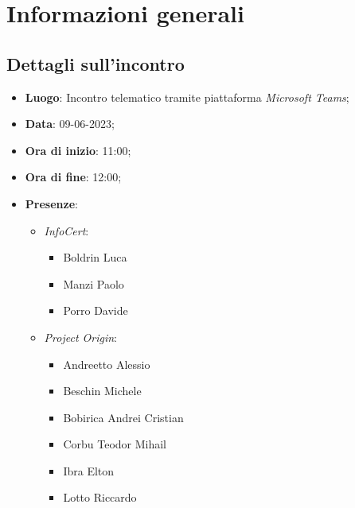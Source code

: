 \section{Informazioni generali}

\subsection{Dettagli sull'incontro}
\begin{itemize}
\item \textbf{Luogo}: Incontro telematico tramite piattaforma \textit{Microsoft Teams\glo};
\item \textbf{Data}: 09-06-2023;
\item \textbf{Ora di inizio}: 11:00;
\item \textbf{Ora di fine}: 12:00;
\item \textbf{Presenze}: 
\begin{itemize}
    \item \textit{InfoCert}: \begin{itemize}
            \item Boldrin Luca 
            \item Manzi Paolo
            \item Porro Davide 
        \end{itemize}  
    \item \textit{Project Origin}:  \begin{itemize}
        \item Andreetto Alessio
        \item Beschin Michele
        \item Bobirica Andrei Cristian
        \item Corbu Teodor Mihail
        \item Ibra Elton
        \item Lotto Riccardo 
    \end{itemize}	
\end{itemize}
\end{itemize}



